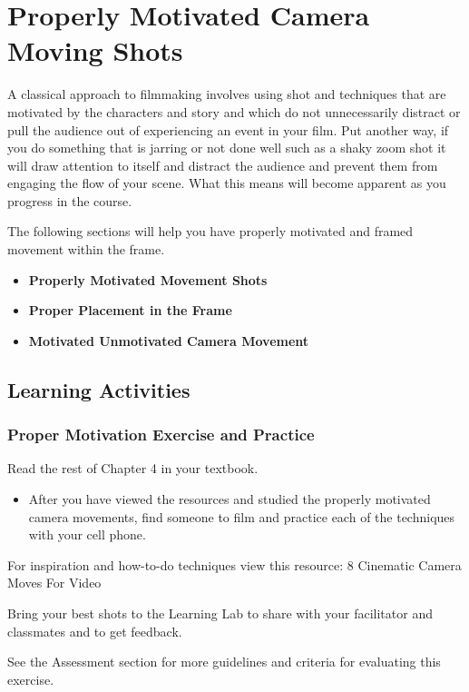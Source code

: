 \documentclass[
]{book}
\providecommand{\tightlist}{%
  \setlength{\itemsep}{0pt}\setlength{\parskip}{0pt}}
\begin{document}
\hypertarget{properly-motivated-camera-moving-shots}{%
\section{Properly Motivated Camera Moving Shots}\label{properly-motivated-camera-moving-shots}}

A classical approach to filmmaking involves using shot and techniques that are motivated by the characters and story and which do not unnecessarily distract or pull the audience out of experiencing an event in your film. Put another way, if you do something that is jarring or not done well such as a shaky zoom shot it will draw attention to itself and distract the audience and prevent them from engaging the flow of your scene. What this means will become apparent as you progress in the course.

The following sections will help you have properly motivated and framed movement within the frame.

\begin{itemize}
\tightlist
\item
  \textbf{Properly Motivated Movement Shots}
\item
  \textbf{Proper Placement in the Frame}
\item
  \textbf{Motivated Unmotivated Camera Movement}
\end{itemize}

\hypertarget{learning-activities-13}{%
\subsection*{Learning Activities}\label{learning-activities-13}}

\begin{reflect}
\hypertarget{proper-motivation-exercise-and-practice}{%
\subsubsection*{Proper Motivation Exercise and Practice}\label{proper-motivation-exercise-and-practice}}

Read the rest of Chapter 4 in your textbook.

\begin{itemize}
\tightlist
\item
  After you have viewed the resources and studied the properly motivated camera movements, find someone to film and practice each of the techniques with your cell phone.
\end{itemize}

For inspiration and how-to-do techniques view this resource: 8 Cinematic Camera Moves For Video

Bring your best shots to the Learning Lab to share with your facilitator and classmates and to get feedback.

See the Assessment section for more guidelines and criteria for evaluating this exercise.
\end{reflect}
\end{document}
